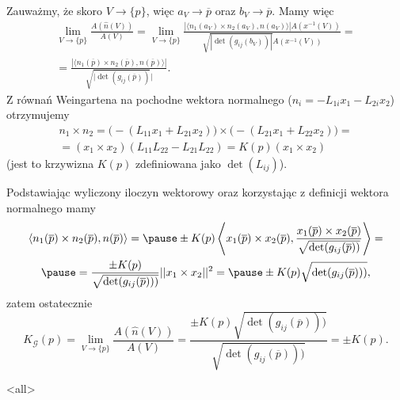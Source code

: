\begin{frame}[<+->]


Zauważmy, że skoro $V\to \{p\}$, więc $a_V\to \overline{p}$ oraz $b_V\to \overline{p}$. \pause Mamy więc
\begin{multline*}
\lim_{V\to \{p\}}\frac{A(\widehat{n}(V))}{A(V)}=\lim_{V\to \{p\}}\frac{|\langle n_1(a_V)\times n_2(a_V),n(a_V)\rangle| A(x^{-1}(V))}{\sqrt{|\det(g_{ij}(b_V))|}A(x^{-1}(V))}=\\
=\frac{|\langle n_1(\overline{p})\times n_2(\overline{p}),n(\overline{p})\rangle|}{\sqrt{|\det(g_{ij}(\overline{p}))}|}.
\end{multline*}
\pause
Z równań Weingartena na pochodne wektora normalnego ($n_i=-L_{1i}x_1-L_{2i}x_2$) otrzymujemy
\begin{multline*}
 n_1\times n_2=\big(-(L_{11}x_1+L_{21}x_2)\big)\times\big(-(L_{21}x_1+L_{22}x_2)\big)=\\=(x_1\times x_2)(L_{11}L_{22}-L_{21}L_{22})=K(p)(x_1\times x_2)
\end{multline*}
(jest to krzywizna $K(p)$ zdefiniowana jako $\det (L_{ij} )$).
\end{frame}
\begin{frame}[<+->]

Podstawiając wyliczony iloczyn wektorowy oraz korzystając z definicji wektora normalnego mamy 
\begin{multline*}
\langle n_1(\overline{p})\times n_2(\overline{p}) ,n(\overline{p})\rangle=\pause\pm K(p)\left\langle x_1(\overline{p})\times x_2(\overline{p}),\frac{x_1(\overline{p})\times x_2(\overline{p})}{\sqrt{\det (g_{ij}(\overline{p}))}}\right\rangle=\\\pause
=\frac{\pm K(p)}{\sqrt{\det (g_{ij}(\overline{p})))}}||x_1\times x_2||^2=\pause \pm K(p)\sqrt{\det (g_{ij}(\overline{p})))},
\end{multline*}
\pause zatem ostatecznie 
\[K_{\mathcal{G}}(p)=\lim_{V\to \{p\}}\frac{A(\widehat{n}(V))}{A(V)}=\frac{\pm K(p)\sqrt{\det (g_{ij}(\overline{p})))}}{\sqrt{\det (g_{ij}(\overline{p})))}}=\pm K(p).\]

\end{frame}
\mode<all>